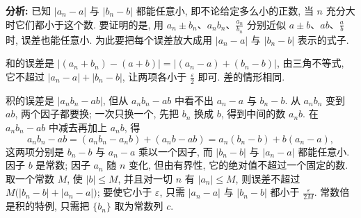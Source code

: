\documentclass[UTF8,openany]{ctexbook}
\theoremstyle{chinesetextbook}
\begin{document}
\par\indent\textbf{分析:} 已知 $|a_n-a|$ 与 $|b_n-b|$ 都能任意小, 即不论给定多么小的正数, 当 $n$ 充分大时它们都小于这个数. 要证明的是, 用 $a_n\pm b_n$、$a_nb_n$、$\displaystyle\frac{a_n}{b_n}$ 分别近似 $a\pm b$、$ab$、$\displaystyle\frac ab$ 时, 误差也能任意小. 为此要把每个误差放大成用 $|a_n-a|$ 与 $|b_n-b|$ 表示的式子.

和的误差是 $|(a_n+b_n)-(a+b)|=|(a_n-a)+(b_n-b)|$, 由三角不等式, 它不超过 $|a_n-a|+|b_n-b|$, 让两项各小于 $\displaystyle\frac\varepsilon2$ 即可. 差的情形相同.

积的误差是 $|a_nb_n-ab|$, 但从 $a_nb_n-ab$ 中看不出 $a_n-a$ 与 $b_n-b$. 从 $a_nb_n$ 变到 $ab$, 两个因子都要换; 一次只换一个, 先把 $b_n$ 换成 $b$, 得到中间的数 $a_nb$. 在 $a_nb_n-ab$ 中减去再加上 $a_nb$, 得
\[
a_nb_n-ab=(a_nb_n-a_nb)+(a_nb-ab)=a_n(b_n-b)+b(a_n-a),
\]
这两项分别是 $b_n-b$ 与 $a_n-a$ 乘以一个因子, 而 $|b_n-b|$ 与 $|a_n-a|$ 都能任意小. 因子 $b$ 是常数; 因子 $a_n$ 随 $n$ 变化, 但由有界性, 它的绝对值不超过一个固定的数. 取一个常数 $M$, 使 $|b|\le M$, 并且对一切 $n$ 有 $|a_n|\le M$, 则误差不超过 $M\bigl(|b_n-b|+|a_n-a|\bigr)$; 要使它小于 $\varepsilon$, 只需 $|a_n-a|$ 与 $|b_n-b|$ 都小于 $\displaystyle\frac\varepsilon{2M}$. 常数倍是积的特例, 只需把 $\{b_n\}$ 取为常数列 $c$.
\end{document}
